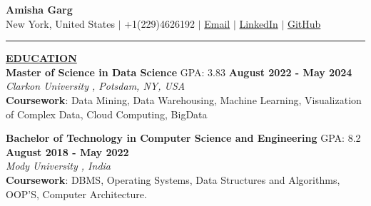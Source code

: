 \documentclass{article}
\begin{document}
\begin{center}
\thispagestyle{empty}
\large \textbf{Amisha Garg \\}
\normalsize New York, United States $\mid$ +1(229)4626192 $\mid$ \href{mailto:amishagarg828@gmail.com}{Email} $\mid$ \href{https://www.linkedin.com/in/your-linkedin}{LinkedIn} $\mid$ \href{https://github.com/your-github}{GitHub} \\
\rule{\textwidth}{1pt}
\end{center}

\noindent \textbf{\underline{EDUCATION}} \\
\textbf{Master of Science in Data Science} GPA: 3.83  \hfill \textbf{August 2022 - May 2024} \\
\textit{Clarkon University , Potsdam, NY, USA}\\
\textbf{Coursework}: Data Mining, Data Warehousing, Machine Learning, Visualization of Complex Data, Cloud Computing, BigData\\

\begin{itemize}[noitemsep,nolistsep,leftmargin=*]
\end{itemize}
\textbf{Bachelor of Technology in Computer Science and Engineering} GPA: 8.2 \hfill \textbf{August 2018 - May 2022} \\
\textit{Mody University , India} \\
\textbf{Coursework}: DBMS, Operating Systems, Data Structures and Algorithms, OOP'S, Computer Architecture.
\end{document}
